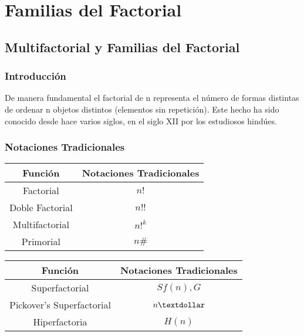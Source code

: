 \chapter{Familias del Factorial}

\section{Multifactorial y Familias del Factorial}

\subsection{Introducción}

De manera fundamental el factorial de n representa el número de formas distintas de ordenar n objetos distintos (elementos sin repetición). Este hecho ha sido conocido desde hace varios siglos, en el siglo XII por los estudiosos hindúes.

\subsection{Notaciones Tradicionales}

\begin{multicols}{2}


	\begin{tabular}{||c||c||}
		\hline
		Función         & Notaciones Tradicionales \\
		\hline
		Factorial       & $n!$                     \\
		\hline
		Doble Factorial & $n!!$                    \\
		\hline
		Multifactorial  & $n!^{k}$                 \\
		\hline
		Primorial       & $ n\# $                  \\
		\hline
	\end{tabular}


	\begin{tabular}{||c||c||}
		\hline
		Función                   & Notaciones  Tradicionales \\
		\hline
		Superfactorial            & $Sf(n), G$                \\
		\hline
		Pickover’s Superfactorial & $n\textdollar$            \\
		\hline
		Hiperfactoria             & $H(n)$                    \\
		\hline
	\end{tabular}

\end{multicols}


